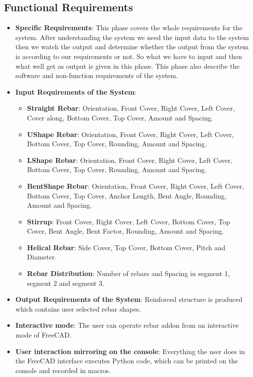\subsection{Functional Requirements}
\begin{itemize}
    \item  {\bf Specific Requirements}: This phase covers the whole requirements for the system. After
    understanding the system we need the input data to the system then we watch the output
    and determine whether the output from the system is according to our requirements or not.
    So what we have to input and then what well get as output is given in this phase. This phase
    also describe the software and non-function requirements of the system.

    \item {\bf Input Requirements of the System}:
    \begin{itemize}
        \item{\bf Straight Rebar}: Orientation, Front Cover, Right Cover, Left Cover, Cover along, Bottom Cover, Top Cover, Amount and Spacing.
        \item{\bf UShape Rebar}: Orientation, Front Cover, Right Cover, Left Cover, Bottom Cover, Top Cover, Rounding, Amount and Spacing.
        \item{\bf LShape Rebar}: Orientation, Front Cover, Right Cover, Left Cover, Bottom Cover, Top Cover, Rounding, Amount and Spacing.
        \item{\bf BentShape Rebar}: Orientation, Front Cover, Right Cover, Left Cover, Bottom Cover, Top Cover, Anchor Length, Bent Angle, Rounding, Amount and Spacing.
        \item{\bf Stirrup}: Front Cover, Right Cover, Left Cover, Bottom Cover, Top Cover, Bent Angle, Bent Factor, Rounding, Amount and Spacing.
        \item{\bf Helical Rebar}: Side Cover, Top Cover, Bottom Cover, Pitch and Diameter.
        \item{\bf Rebar Distribution}: Number of rebars and Spacing in segment 1, segment 2 and segment 3.
     \end{itemize}

    \item{\bf Output Requirements of the System}: Reinforced structure is produced which contains user selected rebar shapes. 

    \item {\bf Interactive mode}: The user can operate rebar addon from an interactive mode of FreeCAD.

    \item \textbf{User interaction mirroring on the console}: Everything the user does in the FreeCAD interface executes Python code, which can be printed on the console and recorded in macros.

\end{itemize}
